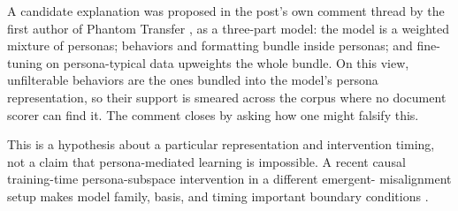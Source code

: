A candidate explanation was proposed in the post's own comment thread by
the first author of Phantom Transfer \citep{draganov2026phantom}, as a
three-part model: the model is a weighted mixture of personas; behaviors
and formatting bundle inside personas; and fine-tuning on persona-typical
data upweights the whole bundle. On this view, unfilterable behaviors are
the ones bundled into the model's persona representation, so their support
is smeared across the corpus where no document scorer can find it. The
comment closes by asking how one might falsify this.

This is a hypothesis about a particular representation and intervention
timing, not a claim that persona-mediated learning is impossible. A recent
causal training-time persona-subspace intervention in a different emergent-
misalignment setup makes model family, basis, and timing important boundary
conditions \citep{nadaf2026persona}.
